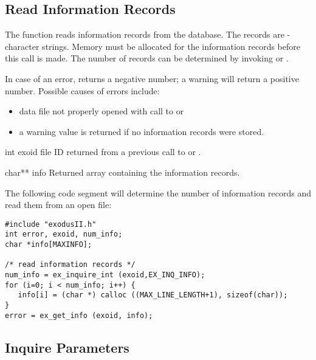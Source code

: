 \subsection{Read Information Records}

The function  reads information records from the
database. The records are -character
strings. Memory must be allocated for the information records before
this call is made. The number of records can be determined by invoking
 or .


In case of an error,  returns a negative number;
a warning will return a positive number. Possible causes of errors
include:


\begin{itemize}
 \item data file not properly opened with call to  or

 \item a warning value is returned if no information records were
 stored.
\end{itemize}





\begin{parameters}
\item[{int exoid \R{}}]
\exo{} file ID returned from a previous call to 
or .

\item[char** info \W{}]
Returned array containing the information records.
\end{parameters}

The following code segment will determine the number of information
records and read them from an open \exo{} file:


\begin{lstlisting}
#include "exodusII.h"
int error, exoid, num_info;
char *info[MAXINFO];

/* read information records */
num_info = ex_inquire_int (exoid,EX_INQ_INFO);
for (i=0; i < num_info; i++) {
   info[i] = (char *) calloc ((MAX_LINE_LENGTH+1), sizeof(char));
}
error = ex_get_info (exoid, info);
\end{lstlisting}



\subsection{Inquire \exo{} Parameters}\label{s:inquire}


